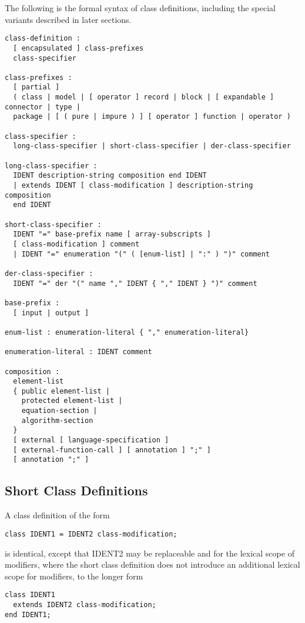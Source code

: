 The following is the formal syntax of class definitions, including the
special variants described in later sections.

\begin{lstlisting}[language=grammar]
class-definition :
  [ encapsulated ] class-prefixes
  class-specifier

class-prefixes :
  [ partial ]
  ( class | model | [ operator ] record | block | [ expandable ] connector | type |
  package | [ ( pure | impure ) ] [ operator ] function | operator )

class-specifier :
  long-class-specifier | short-class-specifier | der-class-specifier

long-class-specifier :
  IDENT description-string composition end IDENT
  | extends IDENT [ class-modification ] description-string composition
  end IDENT

short-class-specifier :
  IDENT "=" base-prefix name [ array-subscripts ]
  [ class-modification ] comment
  | IDENT "=" enumeration "(" ( [enum-list] | ":" ) ")" comment

der-class-specifier :
  IDENT "=" der "(" name "," IDENT { "," IDENT } ")" comment

base-prefix :
  [ input | output ]

enum-list : enumeration-literal { "," enumeration-literal}

enumeration-literal : IDENT comment

composition :
  element-list
  { public element-list |
    protected element-list |
    equation-section |
    algorithm-section
  }
  [ external [ language-specification ]
  [ external-function-call ] [ annotation ] ";" ]
  [ annotation ";" ]
\end{lstlisting}

\subsection{Short Class Definitions}\label{short-class-definitions}

A class definition of the form
\begin{lstlisting}[language=modelica]
class IDENT1 = IDENT2 class-modification;
\end{lstlisting}

is identical, except that IDENT2 may be replaceable and for the lexical
scope of modifiers, where the short class definition does not introduce
an additional lexical scope for modifiers, to the longer form

\begin{lstlisting}[language=modelica]
class IDENT1
  extends IDENT2 class-modification;
end IDENT1;
\end{lstlisting}

